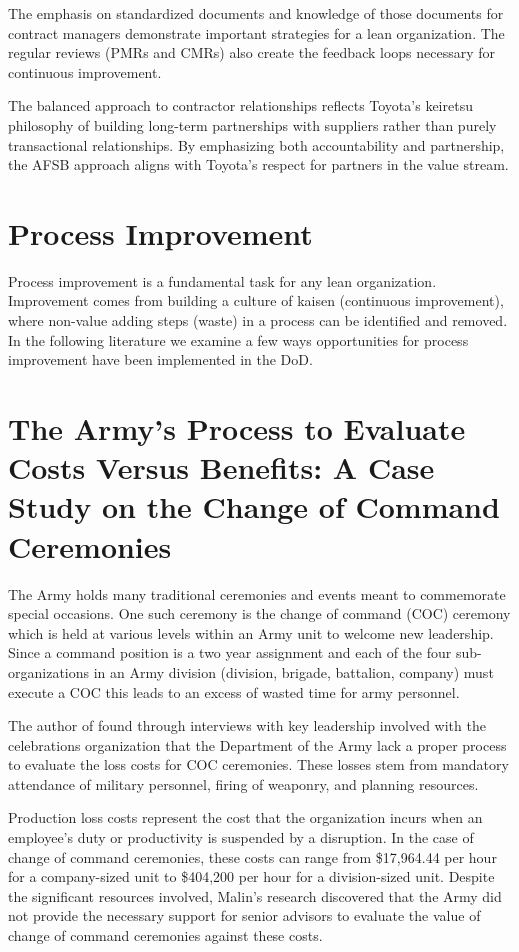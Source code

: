 \documentclass{article}
\begin{document}
			The emphasis on standardized documents and knowledge of those documents for contract managers demonstrate important strategies for a lean organization.
			The regular reviews (PMRs and CMRs) also create the feedback loops necessary for continuous improvement.

			The balanced approach to contractor relationships reflects Toyota's keiretsu philosophy of building long-term partnerships with suppliers rather than purely transactional relationships. 
			By emphasizing both accountability and partnership, the AFSB approach aligns with Toyota's respect for partners in the value stream. 

	\section{Process Improvement}

		Process improvement is a fundamental task for any lean organization. 
		Improvement comes from building a culture of kaisen (continuous improvement), where non-value adding steps (waste) in a process can be identified and removed. In the following literature we examine a few ways opportunities for process improvement have been implemented in the DoD.

		\section{The Army's Process to Evaluate Costs Versus Benefits: A Case Study on the Change of Command Ceremonies \cite{Malin2020}}

			The Army holds many traditional ceremonies and events meant to commemorate special occasions. 
			One such ceremony is the change of command (COC) ceremony which is held at various levels within an Army unit to welcome new leadership. 
			Since a command position is a two year assignment and each of the four sub-organizations in an Army division (division, brigade, battalion, company) must execute a COC this leads to an excess of wasted time for army personnel.

			The author of \cite{Malin2020} found through interviews with key leadership involved with the celebrations organization that the Department of the Army lack a proper process to evaluate the loss costs for COC ceremonies.
			These losses stem from mandatory attendance of military personnel, firing of weaponry, and planning resources.

			Production loss costs represent the cost that the organization incurs when an employee's duty or productivity is suspended by a disruption. In the case of change of command ceremonies, these costs can range from \$17,964.44 per hour for a company-sized unit to \$404,200 per hour for a division-sized unit. 
			Despite the significant resources involved, Malin's research discovered that the Army did not provide the necessary support for senior advisors to evaluate the value of change of command ceremonies against these costs.
\end{document}
